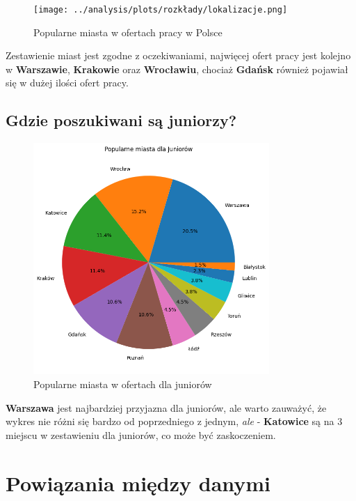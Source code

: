 \documentclass{article}
\begin{document}
\begin{figure}[H]
    \centering
    \texttt{[image: ../analysis/plots/rozkłady/lokalizacje.png]}
    \caption{Popularne miasta w ofertach pracy w Polsce}
\end{figure}

\quad Zestawienie miast jest zgodne z oczekiwaniami, najwięcej ofert pracy jest kolejno w \textbf{Warszawie}, \textbf{Krakowie} oraz \textbf{Wrocławiu}, chociaż
\textbf{Gdańsk} również pojawiał się w dużej ilości ofert pracy.


\subsection{Gdzie poszukiwani są juniorzy?}

\begin{figure}[H]
    \centering
    \includegraphics[width=0.8\textwidth]{../analysis/plots/rozkłady/lokalizacje_dla_juniorów.png}
    \caption{Popularne miasta w ofertach dla juniorów}
\end{figure}

\quad \textbf{Warszawa} jest najbardziej przyjazna dla juniorów, ale
warto zauważyć, że wykres nie różni się bardzo od poprzedniego z jednym, \textit{ale} - \textbf{Katowice} są
na 3 miejscu w zestawieniu dla juniorów, co może być zaskoczeniem.


\section{Powiązania między danymi}
\end{document}

